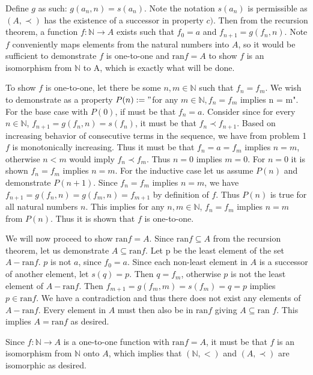 \documentclass{article}
\begin{document}
\begin{enumerate}
	Define $g$ as such: $g(a_n, n) = s(a_n)$. Note the notation $s(a_n)$ is permissible as $(A, \prec)$ has the existence of a successor in property $c)$. Then from the recursion theorem, a function $f: \mathbb{N} \xrightarrow{} A$ exists such that $f_0 = a$ and $f_{n + 1} = g(f_n, n)$. Note $f$ conveniently maps elements from the natural numbers into $A$, so it would be sufficient to demonstrate $f$ is one-to-one and $\text{ran}f = A$ to show $f$ is an isomorphism from $\mathbb{N}$ to A, which is exactly what will be done. 
	
	\medskip
	To show $f$ is one-to-one, let there be some $n,m \in \mathbb{N}$ such that $f_n = f_m$. We wish to demonstrate as a property $P(n) := "$for any $m \in \mathbb{N}, f_n = f_m$ implies n = m". For the base case with $P(0)$, if must be that $f_n = a$. Consider since for every $n \in \mathbb{N}$, $f_{n + 1} = g(f_n, n) = s(f_n)$, it must be that $f_n \prec f_{n + 1}$. Based on increasing behavior of consecutive terms in the sequence, we have from problem 1 $f$ is monotonically increasing. Thus it must be that $f_n = a = f_m$ implies $n = m$, otherwise $n < m$ would imply $f_n \prec f_m$. Thus $n = 0$ implies $m = 0$. For $n = 0$ it is shown $f_n = f_m$ implies $n = m$. For the inductive case let us assume $P(n)$ and demonstrate $P(n + 1)$. Since $f_n = f_m$ implies $n = m$, we have $f_{n + 1} = g(f_n, n) = g(f_m, n) = f_{m + 1}$ by definition of $f$. Thus $P(n)$ is true for all natural numbers $n$. This implies for any $n,m \in \mathbb{N}$, $f_n = f_m$ implies $n = m$ from $P(n)$. Thus it is shown that $f$ is one-to-one.
	
	\medskip
	We will now proceed to show $\text{ran} f = A$. Since $\text{ran} f \subseteq A$ from the recursion theorem, let us demonstrate $A \subseteq \text{ran} f$. Let p be the least element of the set $A - \text{ran} f$. $p$ is not $a$, since $f_0 = a$. Since each non-least element in $A$ is a successor of another element, let $s(q) = p$. Then $q = f_m$, otherwise $p$ is not the least element of $A - \text{ran} f$. Then $f_{m + 1} = g(f_{m}, m) = s(f_{m}) = q = p$ implies $p \in \text{ran} f$. We have a contradiction and thus there does not exist any elements of $A - \text{ran} f$. Every element in $A$ must then also be in $\text{ran} f$ giving $A \subseteq \text{ran } f$. This implies $A = \text{ran} f$ as desired. 
	
	\medskip
	Since $f: \mathbb{N} \xrightarrow{} A$ is a one-to-one function with $\text{ran} f = A$, it must be that $f$ is an isomorphism from $\mathbb{N}$ onto $A$, which implies that $(\mathbb{N}, <)$ and $(A, \prec)$ are isomorphic as desired. 
	

\end{enumerate}
\end{document}
